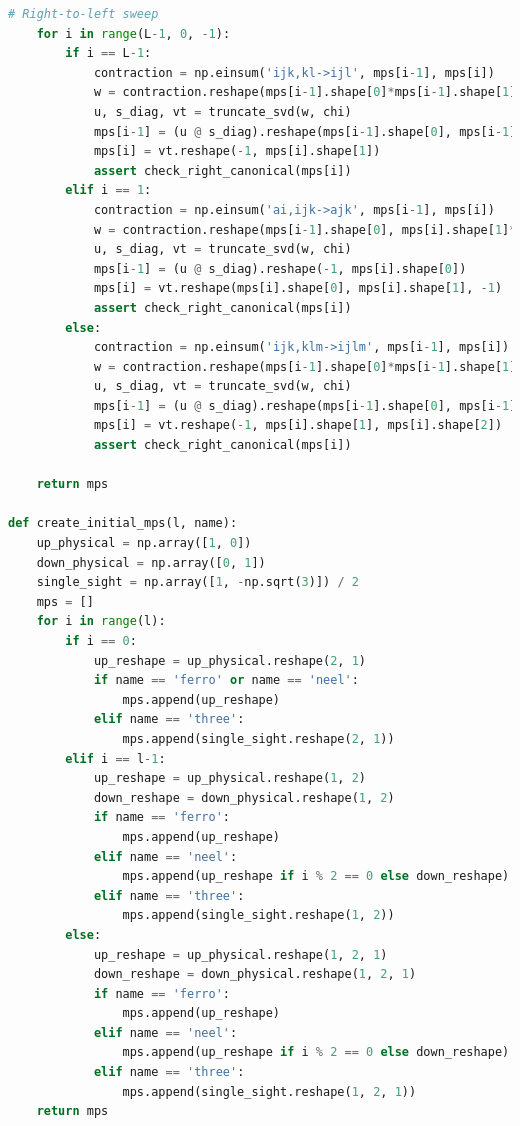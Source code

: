 \documentclass[12pt]{article}
\begin{document}
\begin{lstlisting}[language=Python]
    # Right-to-left sweep
    for i in range(L-1, 0, -1):
        if i == L-1:
            contraction = np.einsum('ijk,kl->ijl', mps[i-1], mps[i])
            w = contraction.reshape(mps[i-1].shape[0]*mps[i-1].shape[1], mps[i].shape[1])
            u, s_diag, vt = truncate_svd(w, chi)
            mps[i-1] = (u @ s_diag).reshape(mps[i-1].shape[0], mps[i-1].shape[1], -1)
            mps[i] = vt.reshape(-1, mps[i].shape[1])
            assert check_right_canonical(mps[i])
        elif i == 1:
            contraction = np.einsum('ai,ijk->ajk', mps[i-1], mps[i])
            w = contraction.reshape(mps[i-1].shape[0], mps[i].shape[1]*mps[i].shape[2])
            u, s_diag, vt = truncate_svd(w, chi)
            mps[i-1] = (u @ s_diag).reshape(-1, mps[i].shape[0])
            mps[i] = vt.reshape(mps[i].shape[0], mps[i].shape[1], -1)
            assert check_right_canonical(mps[i])
        else:
            contraction = np.einsum('ijk,klm->ijlm', mps[i-1], mps[i])
            w = contraction.reshape(mps[i-1].shape[0]*mps[i-1].shape[1], mps[i].shape[1]*mps[i].shape[2])
            u, s_diag, vt = truncate_svd(w, chi)
            mps[i-1] = (u @ s_diag).reshape(mps[i-1].shape[0], mps[i-1].shape[1], -1)
            mps[i] = vt.reshape(-1, mps[i].shape[1], mps[i].shape[2])
            assert check_right_canonical(mps[i])
    
    return mps

def create_initial_mps(l, name):
    up_physical = np.array([1, 0])
    down_physical = np.array([0, 1])
    single_sight = np.array([1, -np.sqrt(3)]) / 2 
    mps = []
    for i in range(l):
        if i == 0:
            up_reshape = up_physical.reshape(2, 1)
            if name == 'ferro' or name == 'neel':
                mps.append(up_reshape)
            elif name == 'three':
                mps.append(single_sight.reshape(2, 1))
        elif i == l-1:
            up_reshape = up_physical.reshape(1, 2)
            down_reshape = down_physical.reshape(1, 2)
            if name == 'ferro':
                mps.append(up_reshape)
            elif name == 'neel':
                mps.append(up_reshape if i % 2 == 0 else down_reshape)
            elif name == 'three':
                mps.append(single_sight.reshape(1, 2))
        else:
            up_reshape = up_physical.reshape(1, 2, 1)
            down_reshape = down_physical.reshape(1, 2, 1)
            if name == 'ferro':
                mps.append(up_reshape)
            elif name == 'neel':
                mps.append(up_reshape if i % 2 == 0 else down_reshape)
            elif name == 'three':
                mps.append(single_sight.reshape(1, 2, 1))
    return mps


\end{lstlisting}
\end{document}
